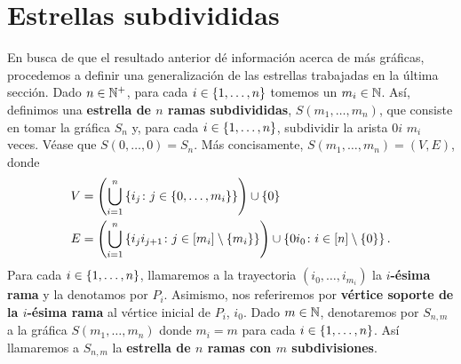 \section{Estrellas subdivididas}
\label{sec:estrellassub}

En busca de que el resultado anterior d\'e informaci\'on acerca de m\'as
gr\'aficas, procedemos a definir una generalizaci\'on de las estrellas
trabajadas en la \'ultima secci\'on. Dado $n\in\mathbb{N}^{+}$, para cada $i\in
\{1,\dots, n\}$ tomemos un $m_i\in \mathbb{N}$. As\'i, definimos una \textbf{estrella de $n$
ramas subdivididas}, $S(m_1,\dots,m_n)$, que consiste en tomar la gr\'afica
$S_n$ y, para cada $i\in\{1,\dots, n\}$, subdividir la arista $0i$ $m_i$ veces.
V\'ease que $S(0,\dots, 0)=S_n$. M\'as concisamente, $S(m_1,\dots,m_n)=(V,E)$,
donde
\begin{align*}
    V &=\left( \bigcup_{i=1}^{n}\left\{ i_j \colon j\in \left\{ 0,\dots, m_i\right\}\right\}\right) \cup \left\{ 0\right\} \\
    E &=\left( \bigcup_{i=1}^{n}\left\{ i_ji_{j+1} \colon j \in \left[ m_i\right]\setminus\left\{ m_i\right\}\right\}\right)
    \cup \left\{ 0i_0 \colon i\in \left[ n\right]\setminus\left\{ 0\right\}\right\}.
\end{align*}
Para cada $i\in\{1,\dots, n\}$, llamaremos a la trayectoria $(i_0,\dots,i_{m_i})$ la
\textbf{$i$-\'esima rama} y la denotamos
por $P_i$. Asimismo, nos referiremos por \textbf{v\'ertice soporte de la
$i$-\'esima rama} al v\'ertice inicial de $P_i$, $i_0$. Dado $m\in\mathbb{N}$,
denotaremos por $S_{n,m}$ a la gr\'afica $S(m_1,\dots,m_n)$ donde $m_i=m$ para
cada $i\in\{1,\dots, n\}$. As\'i llamaremos a $S_{n,m}$ la \textbf{estrella de $n$
ramas con $m$ subdivisiones}. 

